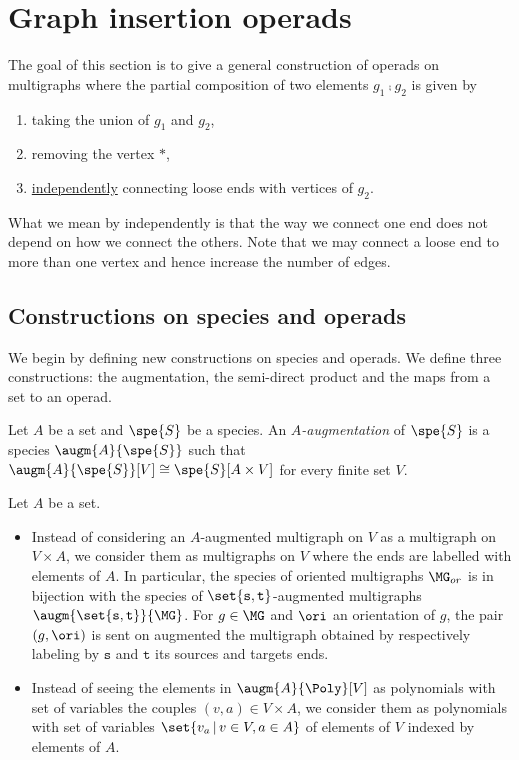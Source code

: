 






\section{Graph insertion operads}\label{sec_graph_operads}
The goal of this section is to give a general construction of operads on multigraphs where the partial 
composition of two elements $g_1\comp g_2$ is given by
\begin{enumerate}
    \item taking the union of $g_1$ and $g_2$,
    \item removing the vertex $\ast$,
    \item \underline{independently} connecting loose ends with vertices of $g_2$.
\end{enumerate}
What we mean by independently is that the way we connect one end does not depend on how we 
connect the others. Note that we may connect a loose end to more than one vertex and hence increase the number
of edges.




\subsection{Constructions on species and operads}\label{sec_constructions}

We begin by defining new constructions on species and operads. We define three constructions:
the augmentation, the semi-direct product and the maps from a set to an operad.

\begin{defi}
    Let $A$ be a set and $\spe{S}$ be a species. An {\em $A$-augmentation} of $\spe{S}$ is a species
     $\augm{A}{\spe{S}}$ such that $\augm{A}{\spe{S}}[V] \cong \spe{S}[A\times V]$ for every finite set $V$.
\end{defi}

\begin{exam}\label{ex_deform}
    Let $A$ be a set.
    \begin{itemize}
        \item Instead of considering an $A$-augmented multigraph on $V$ as a multigraph on $V\times A$, 
        we consider them as multigraphs on $V$ where the ends are labelled with elements of 
        $A$. In particular, the species of oriented multigraphs $\MG_{or}$ is in bijection with the species 
        of $\set{\mathtt{s,t}}$-augmented multigraphs $\augm{\set{\mathtt{s,t}}}{\MG}$. For $g\in\MG$ and 
        $\ori$ an orientation of $g$, the pair $(g,\ori)$ is sent on augmented the multigraph obtained by respectively 
        labeling by $\mathtt{s}$ and $\mathtt{t}$ its sources and targets ends.
        \item Instead of seeing the elements in $\augm{A}{\Poly}[V]$ as polynomials with set of variables the 
        couples $(v,a)\in V\times A$, we consider them as polynomials with set of variables 
        $\set{v_a\,|\,v\in V,a\in A}$ of elements of $V$ indexed by elements of $A$.
    \end{itemize}
\end{exam}

